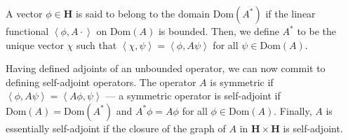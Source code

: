 \documentclass[12pt]{extarticle}
\newcommand{\iprod}[2]{\left\langle #1,#2\right\rangle}
\theoremstyle{plain}
\theoremstyle{definition}
\theoremstyle{remark}
\renewcommand{\newline}{\hfill\break}
\begin{document}
  A vector $\phi \in \mathbf{H}$ is said to belong to the domain $\text{Dom}(A^{\ast})$ if the linear functional $\iprod{\phi}{A\cdot}$ on $\text{Dom}(A)$ is bounded. Then, we define $A^{\ast}$ to be the unique vector $\chi$ such that $\iprod{\chi}{\psi} = \iprod{\phi}{A\psi}$ for all $\psi \in \text{Dom}(A)$.\newline

  Having defined adjoints of an unbounded operator, we can now commit to defining self-adjoint operators. The operator $A$ is symmetric if $\iprod{\phi}{A\psi} = \iprod{A\phi}{\psi}$ --- a symmetric operator is self-adjoint if $\text{Dom}(A) = \text{Dom}(A^{\ast})$ and $A^{\ast}\phi = A\phi$ for all $\phi \in \text{Dom}(A)$. Finally, $A$ is essentially self-adjoint if the closure of the graph of $A$ in $\mathbf{H}\times \mathbf{H}$ is self-adjoint.\newline
\end{document}

